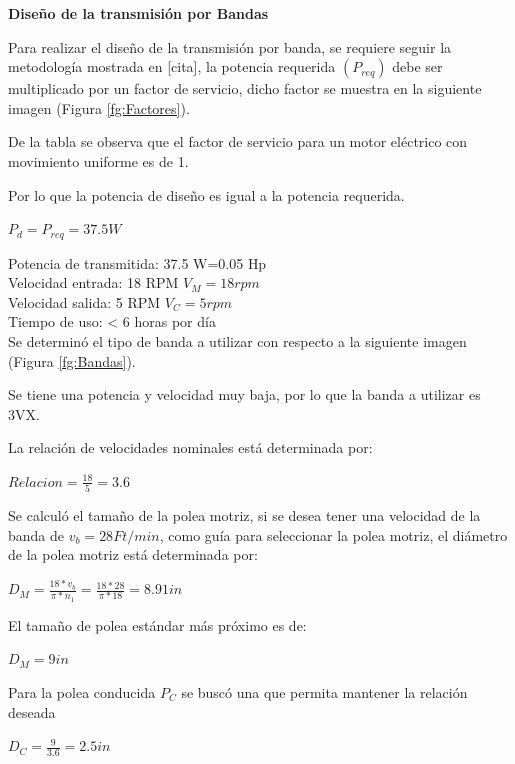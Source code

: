 \textbf{Diseño de la transmisión por Bandas}

Para realizar el diseño de la transmisión por banda, se requiere seguir la metodología mostrada en [cita],  la potencia requerida $(P_{req})$ debe ser multiplicado por un factor de servicio, dicho factor se muestra en la siguiente imagen
 (Figura \ref{fg:Factores}). 

De la tabla se observa que el factor de servicio para un motor eléctrico con movimiento uniforme es de 1.

Por lo que la potencia de diseño es igual a la potencia requerida.

\begin{center}
    $P_d = P_{req}=37.5 W$
\end{center}

Potencia de transmitida:  37.5 W=0.05 Hp \\
Velocidad entrada: 18 RPM $V_M=18 rpm$ \\
Velocidad salida: 5 RPM $V_C=5 rpm$ \\
Tiempo de uso:  < 6 horas por día \\


Se determinó el tipo de banda a utilizar con respecto a la siguiente imagen 
 (Figura \ref{fg:Bandas}). 

Se tiene una potencia y velocidad muy baja, por lo que la banda a  utilizar es 3VX.

La relación de velocidades nominales está determinada por:

\begin{center}
	$Relacion= \frac{18}{5} = 3.6$
\end{center}

Se calculó el tamaño de la polea motriz, si se desea tener una velocidad de la banda de $ v_b = 28 Ft/min$, como guía para seleccionar la polea motriz, el diámetro de la polea motriz está determinada por:
 
\begin{center}
	$D_M = \frac{18*v_b}{\pi*n_1}  =\frac{18*28}{\pi*18} = 8.91 in$
\end{center}

El tamaño de polea estándar más próximo es de:

\begin{center}
	$D_M = 9 in$
\end{center}

Para la polea conducida $P_C$ se buscó una que permita mantener la relación deseada

\begin{center}
	$D_C = \frac{9}{3.6 } = 2.5 in$
\end{center}

